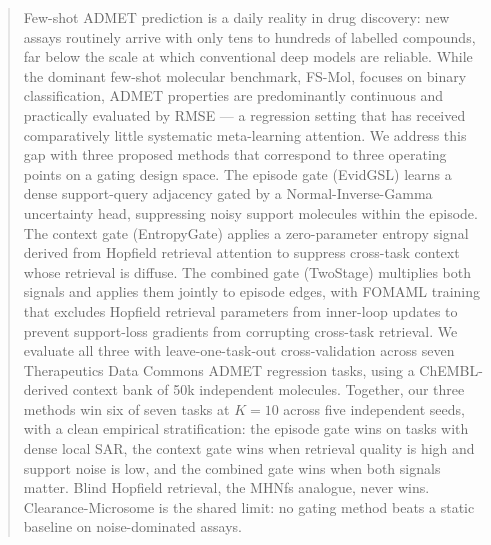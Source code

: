 \documentclass{article}
\theoremstyle{plain}
\theoremstyle{definition}
\theoremstyle{remark}
\begin{document}

\printAffiliationsAndNotice{}

\begin{abstract}
Few-shot ADMET prediction is a daily reality in drug discovery: new assays routinely arrive with only tens to hundreds of labelled compounds, far below the scale at which conventional deep models are reliable. While the dominant few-shot molecular benchmark, FS-Mol, focuses on binary classification, ADMET properties are predominantly continuous and practically evaluated by RMSE — a regression setting that has received comparatively little systematic meta-learning attention. We address this gap with three proposed methods that correspond to three operating points on a gating design space. The episode gate (EvidGSL) learns a dense support-query adjacency gated by a Normal-Inverse-Gamma uncertainty head, suppressing noisy support molecules within the episode. The context gate (EntropyGate) applies a zero-parameter entropy signal derived from Hopfield retrieval attention to suppress cross-task context whose retrieval is diffuse. The combined gate (TwoStage) multiplies both signals and applies them jointly to episode edges, with FOMAML training that excludes Hopfield retrieval parameters from inner-loop updates to prevent support-loss gradients from corrupting cross-task retrieval. We evaluate all three with leave-one-task-out cross-validation across seven Therapeutics Data Commons ADMET regression tasks, using a ChEMBL-derived context bank of 50k independent molecules. Together, our three methods win six of seven tasks at $K\!=\!10$ across five independent seeds, with a clean empirical stratification: the episode gate wins on tasks with dense local SAR, the context gate wins when retrieval quality is high and support noise is low, and the combined gate wins when both signals matter. Blind Hopfield retrieval, the MHNfs analogue, never wins. Clearance-Microsome is the shared limit: no gating method beats a static baseline on noise-dominated assays.
\end{abstract}
\end{document}
